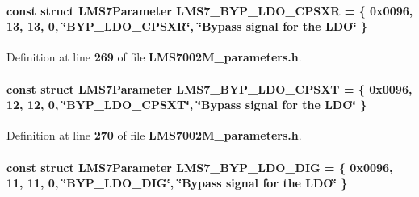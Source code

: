 \paragraph[{L\+M\+S7\+\_\+\+B\+Y\+P\+\_\+\+L\+D\+O\+\_\+\+C\+P\+S\+XR}]{\setlength{\rightskip}{0pt plus 5cm}const struct {\bf L\+M\+S7\+Parameter} L\+M\+S7\+\_\+\+B\+Y\+P\+\_\+\+L\+D\+O\+\_\+\+C\+P\+S\+XR = \{ 0x0096, 13, 13, 0, \char`\"{}\+B\+Y\+P\+\_\+\+L\+D\+O\+\_\+\+C\+P\+S\+X\+R\char`\"{}, \char`\"{}\+Bypass signal for the L\+D\+O\char`\"{} \}\hspace{0.3cm}{\ttfamily [static]}}\label{LMS7002M__parameters_8h_a2ffa5f462587729e55159e3fb11c85c7}


Definition at line {\bf 269} of file {\bf L\+M\+S7002\+M\+\_\+parameters.\+h}.

\paragraph[{L\+M\+S7\+\_\+\+B\+Y\+P\+\_\+\+L\+D\+O\+\_\+\+C\+P\+S\+XT}]{\setlength{\rightskip}{0pt plus 5cm}const struct {\bf L\+M\+S7\+Parameter} L\+M\+S7\+\_\+\+B\+Y\+P\+\_\+\+L\+D\+O\+\_\+\+C\+P\+S\+XT = \{ 0x0096, 12, 12, 0, \char`\"{}\+B\+Y\+P\+\_\+\+L\+D\+O\+\_\+\+C\+P\+S\+X\+T\char`\"{}, \char`\"{}\+Bypass signal for the L\+D\+O\char`\"{} \}\hspace{0.3cm}{\ttfamily [static]}}\label{LMS7002M__parameters_8h_ac269c2292e00d4ed2db4114e3fb33e74}


Definition at line {\bf 270} of file {\bf L\+M\+S7002\+M\+\_\+parameters.\+h}.

\paragraph[{L\+M\+S7\+\_\+\+B\+Y\+P\+\_\+\+L\+D\+O\+\_\+\+D\+IG}]{\setlength{\rightskip}{0pt plus 5cm}const struct {\bf L\+M\+S7\+Parameter} L\+M\+S7\+\_\+\+B\+Y\+P\+\_\+\+L\+D\+O\+\_\+\+D\+IG = \{ 0x0096, 11, 11, 0, \char`\"{}\+B\+Y\+P\+\_\+\+L\+D\+O\+\_\+\+D\+I\+G\char`\"{}, \char`\"{}\+Bypass signal for the L\+D\+O\char`\"{} \}\hspace{0.3cm}{\ttfamily [static]}}\label{LMS7002M__parameters_8h_ab351bbd3e39e377a3a70f2252107be9c}


